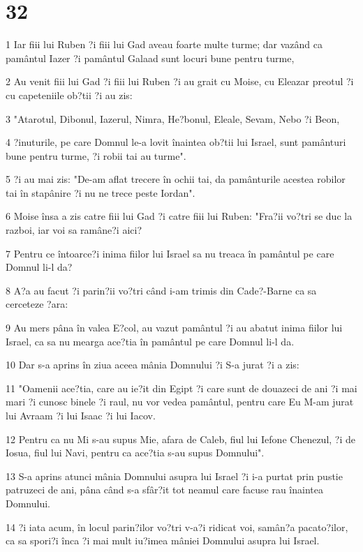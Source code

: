 \chapter{32}

\par 1 Iar fiii lui Ruben ?i fiii lui Gad aveau foarte multe turme; dar vazând ca pamântul Iazer ?i pamântul Galaad sunt locuri bune pentru turme,
\par 2 Au venit fiii lui Gad ?i fiii lui Ruben ?i au grait cu Moise, cu Eleazar preotul ?i cu capeteniile ob?tii ?i au zis:
\par 3 "Atarotul, Dibonul, Iazerul, Nimra, He?bonul, Eleale, Sevam, Nebo ?i Beon,
\par 4 ?inuturile, pe care Domnul le-a lovit înaintea ob?tii lui Israel, sunt pamânturi bune pentru turme, ?i robii tai au turme".
\par 5 ?i au mai zis: "De-am aflat trecere în ochii tai, da pamânturile acestea robilor tai în stapânire ?i nu ne trece peste Iordan".
\par 6 Moise însa a zis catre fiii lui Gad ?i catre fiii lui Ruben: "Fra?ii vo?tri se duc la razboi, iar voi sa ramâne?i aici?
\par 7 Pentru ce întoarce?i inima fiilor lui Israel sa nu treaca în pamântul pe care Domnul li-l da?
\par 8 A?a au facut ?i parin?ii vo?tri când i-am trimis din Cade?-Barne ca sa cerceteze ?ara:
\par 9 Au mers pâna în valea E?col, au vazut pamântul ?i au abatut inima fiilor lui Israel, ca sa nu mearga ace?tia în pamântul pe care Domnul li-l da.
\par 10 Dar s-a aprins în ziua aceea mânia Domnului ?i S-a jurat ?i a zis:
\par 11 "Oamenii ace?tia, care au ie?it din Egipt ?i care sunt de douazeci de ani ?i mai mari ?i cunosc binele ?i raul, nu vor vedea pamântul, pentru care Eu M-am jurat lui Avraam ?i lui Isaac ?i lui Iacov.
\par 12 Pentru ca nu Mi s-au supus Mie, afara de Caleb, fiul lui Iefone Chenezul, ?i de Iosua, fiul lui Navi, pentru ca ace?tia s-au supus Domnului".
\par 13 S-a aprins atunci mânia Domnului asupra lui Israel ?i i-a purtat prin pustie patruzeci de ani, pâna când s-a sfâr?it tot neamul care facuse rau înaintea Domnului.
\par 14 ?i iata acum, în locul parin?ilor vo?tri v-a?i ridicat voi, samân?a pacato?ilor, ca sa spori?i înca ?i mai mult iu?imea mâniei Domnului asupra lui Israel.

